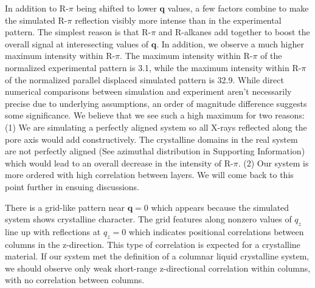 \documentclass[journal=jpcbfk,manusciprt=article]{achemso}
\begin{document}
  In addition to R-$\pi$ being shifted to lower $\mathbf{q}$ values, a few
  factors combine to make the simulated R-$\pi$ reflection visibly more intense
  than in the experimental pattern. The simplest reason is that R-$\pi$ and
  R-alkanes add together to boost the overall signal at interesecting values of
  $\mathbf{q}$. In addition, we observe a much higher maximum intensity within
  R-$\pi$. The maximum intensity within R-$\pi$ of the normalized experimental
  pattern is 3.1, while the maximum intensity within R-$\pi$ of the normalized
  parallel displaced simulated pattern is 32.9. 
  While direct numerical
  comparisons between simulation and experiment aren't necessarily precise due to
  underlying assumptions, an order of magnitude difference suggests some
  significance. We believe that we see such a high maximum for two reasons: (1)
  We are simulating a perfectly aligned system so all X-rays reflected along the
  pore axis would add constructively. The crystalline domains in the real system
  are not perfectly aligned (See azimuthal distribution in Supporting
  Information) which would lead to an overall decrease in the intensity of
  R-$\pi$. (2) Our system is more ordered with high correlation between layers.
  We will come back to this point further in ensuing discussions.

  There is a grid-like pattern near $\mathbf{q}=0$ which appears because the
  simulated system shows crystalline character. The grid features along nonzero
  values of $q_z$ line up with reflections at $q_z=0$ which indicates positional
  correlations between columns in the z-direction. This type of correlation is
  expected for a crystalline material. 
If our system met the definition of a
  columnar liquid crystalline system, we should observe only weak short-range
  z-directional correlation within columns, with no correlation between
  columns\cite{chaikin_principles_1995}. 
\end{document}
